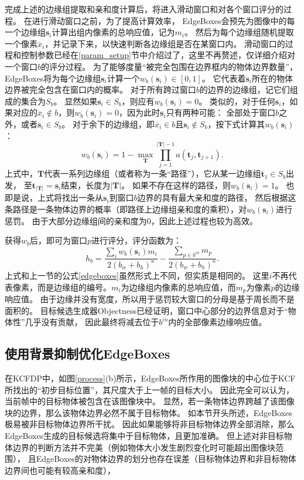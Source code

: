 完成上述的边缘组提取和亲和度计算后，将进入滑动窗口和对各个窗口评分的过程。
在进行滑动窗口之前，为了提高计算效率，
EdgeBoxes会预先为图像中的每一个边缘组$\textbf{s}_i$计算出组内像素的总响应值，记为$m_i$。
然后为每个边缘组随机提取一个像素$\overline{x}_i$，并记录下来，以快速判断各边缘组是否在某窗口内。
滑动窗口的过程和控制参数已经在\ref{param_setup}节中介绍过了，这里不再赘述，仅详细介绍对一个窗口$b$的评分过程。
为了能够度量``被完全包围在边界框内的物体边界数量''，EdgeBoxes将为每个边缘组$\textbf{s}_i$计算一个$w_b(\textbf{s}_i)\in [0,1]$。
它代表着$\textbf{s}_i$所在的物体边界被完全包含在窗口内的概率。
对于所有跨过窗口$b$的边界的边缘组，记它们组成的集合为$S_b$。
显然如果$\textbf{s}_i\in S_b$，则应有$w_b(\textbf{s}_i)=0$。
类似的，对于任何$\textbf{s}_i$，如果对应的$\overline{x}_i\notin b$，则$w_b(\textbf{s}_i)=0$，因为此时$\textbf{s}_i$只有两种可能：
全部处于窗口$b$之外，或者$\textbf{s}_i\in S_b$。
对于余下的边缘组，即$\overline{x}_i\in b$且$\textbf{s}_i\notin S_b$，按下式计算其$w_b(\textbf{s}_i)$：
\begin{equation}
w_b(\textbf{s}_i)=1-\max_\textbf{T}{\prod_{j=1}^{|\textbf{T}|-1}a(\textbf{t}_j,\textbf{t}_{j+1})}. \label{wbsi}
\end{equation}
上式中，$\textbf{T}$代表一系列边缘组（或者称为一条``路径''），它从某一边缘组$\textbf{t}_1\in S_b$出发，
至$\textbf{t}_{|\textbf{T}|}=\textbf{s}_i$结束，长度为$|\textbf{T}|$。
如果不存在这样的路径，则$w_b(\textbf{s}_i)=1$。
也即是说，上式将找出一条从$\textbf{s}_i$到窗口$b$边界的具有最大亲和度的路径，
然后根据这条路径是一条物体边界的概率（即路径上边缘组亲和度的乘积），对$w_b(\textbf{s}_i)$进行惩罚。
由于大部分边缘组间的亲和度为$0$，因此上述过程也较为高效。

获得$w_b$后，即可为窗口$p$进行评分，评分函数为：
\begin{equation}
	h_b = \frac{\sum_{i}w_b(\textbf{s}_i)m_i}{2(b_w+b_h)^\kappa} - \frac{\sum_{p\in b^{in}}m_p}{2(b_w+b_h)^\kappa}. \label{edgeboxes-full}
\end{equation}
上式和上一节的公式\ref{edgeboxes}虽然形式上不同，但实质是相同的。
这里$i$不再代表像素，而是边缘组的编号。$m_i$为边缘组内像素的总响应值，而$m_p$为像素$p$的边缘响应值。
由于边缘并没有宽度，所以用于惩罚较大窗口的分母是基于周长而不是面积的。
目标候选生成器Objectness已经证明，窗口中心部分的边界信息对于``物体性''几乎没有贡献，
因此最终将减去位于$b^{in}$内的全部像素边缘响应值。

\subsection{使用背景抑制优化EdgeBoxes}
在KCFDP中，如图\ref{process}(b)所示，EdgeBoxes所作用的图像块的中心位于KCF所找出的``初步目标位置''，其尺度大于上一帧的目标大小。
因此完全可以认为，当前帧中的目标物体被包含在该图像块中。
显然，若一条物体边界跨越了该图像块的边界，那么该物体边界必然不属于目标物体。
如本节开头所述，EdgeBoxes极易被非目标物体边界所干扰。
因此如果能够将非目标物体边界全部消除，那么EdgeBoxes生成的目标候选将集中于目标物体，且更加准确。
但上述对非目标物体边界的判断方法并不完美（例如物体大小发生剧烈变化时可能超出图像块范围），
且EdgeBoxes的对物体边界的划分也存在误差（目标物体边界和非目标物体边界间也可能有较高亲和度），


